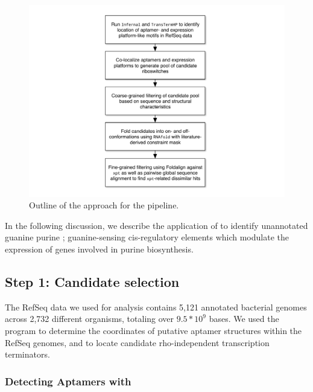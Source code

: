 \begin{figure}[!ht]
\centering
\includegraphics[width=.9\textwidth]{Figures/Ribofinder/ribofinderOverview.pdf}
\caption{Outline of the approach for the \rfinder pipeline.}
\label{fig:rfinder:flowchart}
\end{figure}

In the following discussion, we describe the application of \rfinder to identify
unannotated guanine purine \rbs; guanine-sensing cis-regulatory elements
which modulate the expression of genes involved in purine biosynthesis.

\subsection{Step 1: Candidate selection}
\label{subsec:rfinder:selection}

The RefSeq data we used for analysis contains 5,121 annotated bacterial genomes
across 2,732 different organisms, totaling over $9.5 * 10^9$ bases. We used the
program \infernal to determine the coordinates of putative aptamer structures
within the RefSeq genomes, and \tthp to locate candidate rho-independent
transcription terminators.

\subsubsection{Detecting Aptamers with \infernal}
\label{subsubsec:rfinder:infernal}

